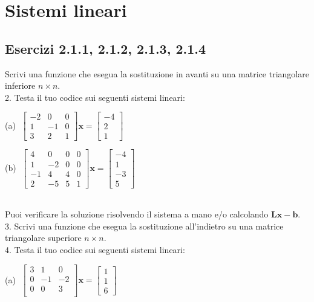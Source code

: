 \documentclass[letterpaper, 12pt]{article}
\numberwithin{equation}{section}    %
\begin{document}
\section{Sistemi lineari}
\label{sistemi_lineari}
\subsection{Esercizi 2.1.1, 2.1.2, 2.1.3, 2.1.4}
Scrivi una funzione che esegua la sostituzione in avanti su una matrice triangolare inferiore $n\times n$. \\
2. Testa il tuo codice sui seguenti sistemi lineari: \\
\begin{minipage}{0.48\textwidth}
    (a) $\; \begin{bmatrix}
        -2 & 0 & 0 \\
        1 & -1 & 0 \\
        3 & 2 & 1 
        \end{bmatrix} 
        \mathbf{x} = \begin{bmatrix}
        -4 \\ 2 \\ 1
        \end{bmatrix}$
\end{minipage}
\hfill
\begin{minipage}{0.48\textwidth}
    (b) $\;\begin{bmatrix}
        4 & 0 & 0 & 0 \\
        1 & -2 & 0 & 0 \\
        -1 & 4 & 4 & 0 \\
        2 & -5 & 5 & 1
        \end{bmatrix} 
        \mathbf{x} = \begin{bmatrix}
        -4 \\ 1 \\ -3 \\ 5
        \end{bmatrix}$
\end{minipage}
\\
Puoi verificare la soluzione risolvendo il sistema a mano e/o calcolando $\mathbf{L}\mathbf{x} - \mathbf{b}$.\\
3. Scrivi una funzione che esegua la sostituzione all'indietro su una matrice triangolare superiore $n\times n$.\\
4. Testa il tuo codice sui seguenti sistemi lineari: \\
\begin{minipage}{0.48\textwidth}
    (a) $\;\begin{bmatrix}
        3 & 1 & 0  \\
        0 & -1 & -2  \\
        0 & 0 & 3  \\
        \end{bmatrix} \mathbf{x} = \begin{bmatrix}
        1 \\ 1 \\ 6
        \end{bmatrix}$
\end{minipage}
\end{document}

